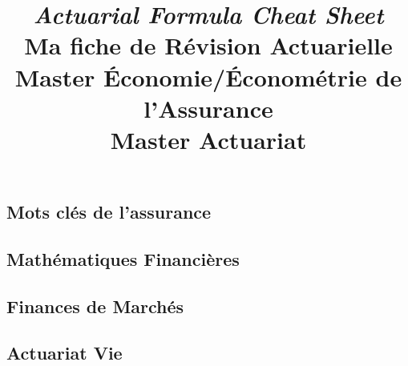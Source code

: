 \documentclass[french,a4paper]{article}
\title{
\author{}
\emph{Actuarial Formula Cheat Sheet}\\
Ma fiche de Révision Actuarielle\\\medskip\small
Master Économie/Économétrie de l'Assurance\\
Master Actuariat}
\theoremstyle{sansparenthese}
\begin{document}
\maketitle
%
 \setcounter{higher}{1}
\begin{center}
%
\end{center}

\begin{center}
	\bigskip
	
\section*{Mots clés de l'assurance}
    \medskip
\end{center}


\begin{multicols}{2}
	

\end{multicols}

\newpage
\begin{center}
	\section*{Mathématiques Financières}
	\medskip
\end{center}


\begin{multicols}{2}
	
	
\end{multicols}

\begin{center}
\section*{Finances de Marchés}
    \medskip
\end{center}

\begin{multicols}{2}


\end{multicols}

\newpage
\begin{center}
\section*{Actuariat Vie}
    \medskip
\end{center}

\begin{multicols}{2}
	

\end{multicols}
\end{document}
